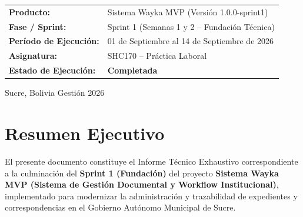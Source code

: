 \documentclass[a4paper,12pt]{article}
\begin{document}
\begin{titlepage}
\begin{center}
        \vspace{3cm}

        \begin{tcolorbox}[
            colback=colorGrisFondo,
            colframe=colorAzul,
            arc=3mm,
            width=0.9\linewidth,
            boxrule=1.2pt
        ]
            \centering
            \vspace{0.2cm}
            \begin{tabularx}{\linewidth}{@{}lY@{}}
                \textbf{\color{colorAzul}Producto:} & Sistema Wayka MVP (Versión 1.0.0-sprint1) \\
                \textbf{\color{colorAzul}Fase / Sprint:} & Sprint 1 (Semanas 1 y 2 -- Fundación Técnica) \\
                \textbf{\color{colorAzul}Período de Ejecución:} & 01 de Septiembre al 14 de Septiembre de 2026 \\
                \textbf{\color{colorAzul}Asignatura:} & SHC170 -- Práctica Laboral \\
                \textbf{\color{colorAzul}Estado de Ejecución:} & \textbf{\color{colorExito}Completada}
            \end{tabularx}
            \vspace{0.2cm}
        \end{tcolorbox}
    \end{center}

    \vfill

    \begin{center}
        \small\color{colorTextoMuted}
        Sucre, Bolivia \textbar{} Gestión 2026
    \end{center}
\end{titlepage}
\hypersetup{pageanchor=true}

\newpage
\tableofcontents
\newpage

\section{Resumen Ejecutivo}

El presente documento constituye el Informe Técnico Exhaustivo correspondiente a la culminación del \textbf{Sprint 1 (Fundación)} del proyecto \textbf{Sistema Wayka MVP (Sistema de Gestión Documental y Workflow Institucional)}, implementado para modernizar la administración y trazabilidad de expedientes y correspondencias en el Gobierno Autónomo Municipal de Sucre.
\end{document}
